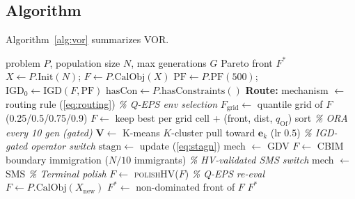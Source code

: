 \documentclass[preprint,12pt]{elsarticle}
\begin{document}
\subsection{Algorithm}
\label{sec:pseudo}
Algorithm~\ref{alg:vor} summarizes VOR.

\begin{algorithm}[t]
\caption{VOR: Battlefield-Adaptive Online Reference-Reallocation EA}\label{alg:vor}
\begin{algorithmic}[1]
\REQUIRE problem $P$, population size $N$, max generations $G$
\ENSURE Pareto front $F^*$
\STATE $X\gets P.\mathrm{Init}(N)$; \hspace{1pt} $F\gets P.\mathrm{CalObj}(X)$
\STATE $\mathrm{PF}\gets P.\mathrm{PF}(500)$; \hspace{1pt} $\mathrm{IGD}_0\gets\mathrm{IGD}(F,\mathrm{PF})$
\STATE $\mathrm{hasCon}\gets P.\mathrm{hasConstraints}()$
\STATE \textbf{Route:} mechanism $\gets$ routing rule (\autoref{eq:routing})
   \STATE \textit{\% Q-EPS env selection}
   \STATE $F_{\text{grid}}\gets$ quantile grid of $F$ (0.25/0.5/0.75/0.9)
   \STATE $F\gets$ keep best per grid cell + (front, dist, $q_{\mathrm{Of}}$) sort
   \STATE \textit{\% ORA every 10 gen (gated)}
      \STATE $\mathbf{V}\gets$ K-means $K$-cluster pull toward $\mathbf{e}_k$ (lr $0.5$)
   \ENDIF
   \STATE \textit{\% IGD-gated operator switch}
   \STATE $\mathrm{stagn}\gets$ update (\autoref{eq:stagn})
      \STATE mech $\leftarrow$ \textsc{GDV}
   \ENDIF
      \STATE $F\gets$ \textsc{CBIM} boundary immigration ($N/10$ immigrants)
   \ENDIF
   \STATE \textit{\% HV-validated SMS switch}
      \STATE mech $\leftarrow$ \textsc{SMS}
   \ENDIF
   \STATE \textit{\% Terminal polish}
      \STATE $F\gets$ \textsc{polishHV}($F$)
   \ENDIF
   \STATE \textit{\% Q-EPS re-eval}
   \STATE $F\gets P.\mathrm{CalObj}(X_{\text{new}})$
\ENDFOR
\STATE $F^*\gets$ non-dominated front of $F$
\RETURN $F^*$
\end{algorithmic}
\end{algorithm}
\end{document}

